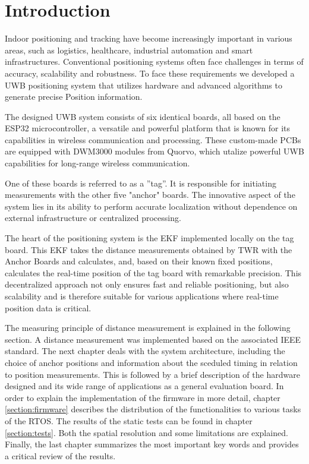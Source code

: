 \documentclass[10pt,a4paper,twocolumn]{article}
\begin{document}

\section{Introduction}\label{section:intro}
Indoor positioning and tracking have become increasingly important in various areas,
such as logistics, healthcare, industrial automation and smart infrastructures.
Conventional positioning systems often face challenges in terms of accuracy, scalability and robustness.
To face these requirements we developed a \ac{UWB} positioning system that utilizes
hardware and advanced algorithms to generate precise Position information.

The designed \ac{UWB} system consists of six identical boards,
all based on the ESP32 microcontroller, a versatile and powerful platform that is 
known for its capabilities in wireless communication and processing.
These custom-made \acp{PCB} are equipped with DWM3000 modules from Quorvo,
which utalize powerful UWB capabilities for long-range wireless communication.

One of these boards is referred to as a ''tag''.
It is responsible for initiating measurements with the other five "anchor" boards.
The innovative aspect of the system lies in its ability to perform accurate localization
without dependence on external infrastructure or centralized processing.

The heart of the positioning system is the \acf{EKF} implemented locally on the tag board.
This \ac{EKF} takes the distance measurements obtained by \acf{TWR} with the Anchor Boards and calculates,
and, based on their known fixed positions, calculates the real-time position of the tag board
with remarkable precision.
This decentralized approach not only ensures fast and reliable positioning, but also scalability and is therefore
suitable for various applications where real-time position data is critical.

The measuring principle of distance measurement is explained in the following section.
A distance measurement was implemented based on the associated IEEE standard.
The next chapter deals with the system architecture, including the choice of anchor positions and
information about the sceduled timing in relation to position measurements.
This is followed by a brief description of the hardware designed and
its wide range of applications as a general evaluation board.
In order to explain the implementation of the firmware in more detail,
chapter \ref{section:firmware} describes the distribution of the functionalities to various tasks of the \ac{RTOS}.
The results of the static tests can be found in chapter \ref{section:tests}.
Both the spatial resolution and some limitations are explained.
Finally, the last chapter summarizes the most important key words and provides a critical review of the results.
\end{document}
